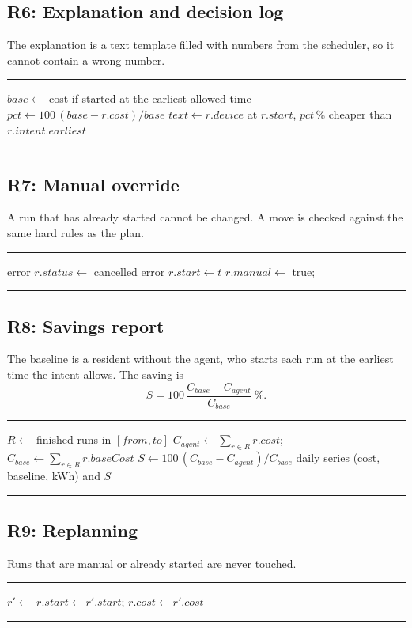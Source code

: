 \documentclass[conference,a4paper]{IEEEtran}
\newenvironment{pseudo}
  {\par\vspace{2pt}\noindent\begin{minipage}{\columnwidth}\hrule\vspace{2pt}\footnotesize\begin{algorithmic}[1]}
  {\end{algorithmic}\vspace{1pt}\hrule\end{minipage}\par\vspace{3pt}}
\begin{document}
\subsection{R6: Explanation and decision log}
The explanation is a text template filled with numbers from the scheduler, so it cannot contain a wrong number.
\begin{pseudo}
\State $base \gets$ cost if started at the earliest allowed time
\State $pct \gets 100\,(base - r.cost)/base$
\State $text \gets r.device$ at $r.start$, $pct$\,\% cheaper than $r.intent.earliest$
\State {}
\EndProcedure
\end{pseudo}

\subsection{R7: Manual override}
A run that has already started cannot be changed. A move is checked against the same hard rules as the plan.
\begin{pseudo}
 
  \State \Return error
\EndIf
{}
  \State $r.status \gets$ cancelled
\Else
    \State \Return error
  \EndIf
  \State $r.start \gets t$
\EndIf
\State $r.manual \gets$ true; 
\EndProcedure
\end{pseudo}

\subsection{R8: Savings report}
The baseline is a resident without the agent, who starts each run at the earliest time the intent allows. The saving is
\begin{equation}
S = 100\,\frac{C_{base} - C_{agent}}{C_{base}}\ \%.
\end{equation}
\begin{pseudo}
\State $R \gets$ finished runs in $[from, to]$
\State $C_{agent} \gets \sum_{r \in R} r.cost$; $C_{base} \gets \sum_{r \in R} r.baseCost$
\State $S \gets 100\,(C_{base} - C_{agent}) / C_{base}$
\State \Return daily series (cost, baseline, kWh) and $S$
\EndProcedure
\end{pseudo}

\subsection{R9: Replanning}
Runs that are manual or already started are never touched.
\begin{pseudo}
 
  \State $r' \gets$  
    \State $r.start \gets r'.start$; $r.cost \gets r'.cost$
    \State {}
  \EndIf
\EndFor
\EndProcedure
\end{pseudo}
\end{document}
